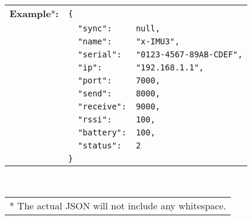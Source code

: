 \begin{table}[H]
    \begin{tabular}{l l l}
        \textbf{Example}*\textbf{:} & \texttt{\{}\\
        & \texttt{~~"sync":} & \texttt{null,}\\
        & \texttt{~~"name":} & \texttt{"x-IMU3",}\\
        & \texttt{~~"serial":} & \texttt{"0123-4567-89AB-CDEF",}\\
        & \texttt{~~"ip":} & \texttt{"192.168.1.1",}\\
        & \texttt{~~"port":} & \texttt{7000,}\\
        & \texttt{~~"send":} & \texttt{8000,}\\
        & \texttt{~~"receive":} & \texttt{9000,}\\
        & \texttt{~~"rssi":} & \texttt{100,}\\
        & \texttt{~~"battery":} & \texttt{100,}\\
        & \texttt{~~"status":} & \texttt{2}\\
        & \texttt{\}}
    \end{tabular}\\
    \begin{tabular}{l}
        \\
        \footnotesize{* The actual \acs{JSON} will not include any whitespace.}
    \end{tabular}
\end{table}
